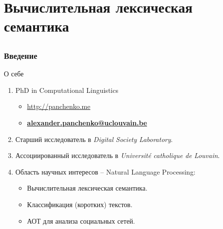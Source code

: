 
\section[Лексическая семантика]{Вычислительная лексическая семантика}
\subsection{ }


\begin{frame}
\frametitle{Введение}

\begin{block}{О себе}

\begin{enumerate}
\item PhD in Computational Linguistics
\begin{itemize}
    \item \url{http://panchenko.me}
    \item \bf{\url{alexander.panchenko@uclouvain.be}}
\end{itemize}

\item Старший исследователь в \textit{Digital Society Laboratory}.

\item Ассоциированный исследователь в \textit{Universit\'{e} catholique de
Louvain}.

\item Область научных интересов -- Natural Language Processing:

\begin{itemize}
    \item Вычислительная лексическая семантика.
    \item Классификация (коротких) текстов.
    \item АОТ для анализа социальных сетей.  
\end{itemize}


\end{enumerate}
\end{block}

\end{frame}






